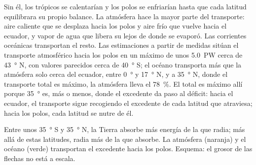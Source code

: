 Sin él, los trópicos se calentarían y los polos se enfriarían hasta que cada
latitud equilibrara su propio balance. La atmósfera hace la mayor parte del
transporte: aire caliente que se desplaza hacia los polos y aire frío que
vuelve hacia el ecuador, y vapor de agua que libera su  lejos
de donde se evaporó. Las corrientes oceánicas transportan el resto. Las
estimaciones a partir de medidas sitúan el transporte atmosférico hacia los
polos en un máximo de unos \qty{5.0}{PW} cerca de \qty{43}{\degree} N, con
valores parecidos cerca de \qty{40}{\degree} S; el océano transporta más que
la atmósfera solo cerca del ecuador, entre \qty{0}{\degree} y
\qty{17}{\degree} N, y a \qty{35}{\degree} N, donde el transporte total es
máximo, la atmósfera lleva el \qty{78}{\percent}. El total es máximo allí
porque \qty{35}{\degree} es, más o menos, donde el excedente da paso al
déficit: hacia el ecuador, el transporte sigue recogiendo el excedente de
cada latitud que atraviesa; hacia los polos, cada latitud se nutre de él.

\begin{omfigure}

{\small Entre unos \qty{35}{\degree} S y \qty{35}{\degree} N, la Tierra
absorbe más energía de la que radia; más allá de estas latitudes, radia más
de la que absorbe. La atmósfera (naranja) y el océano (verde) transportan el
excedente hacia los polos. Esquema: el grosor de las flechas no está a
escala.}
\end{omfigure}


